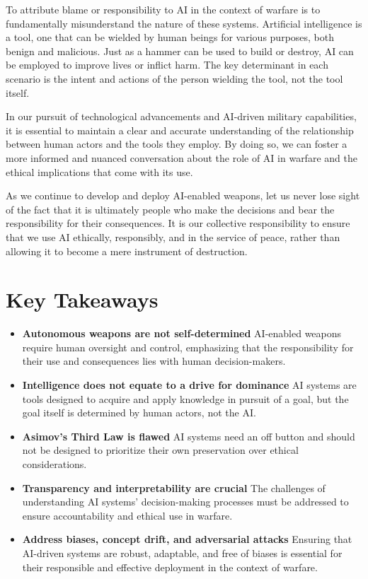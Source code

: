 To attribute blame or responsibility to AI in the context of warfare is to fundamentally misunderstand the nature of these systems. Artificial intelligence is a tool, one that can be wielded by human beings for various purposes, both benign and malicious. Just as a hammer can be used to build or destroy, AI can be employed to improve lives or inflict harm. The key determinant in each scenario is the intent and actions of the person wielding the tool, not the tool itself.

In our pursuit of technological advancements and AI-driven military capabilities, it is essential to maintain a clear and accurate understanding of the relationship between human actors and the tools they employ. By doing so, we can foster a more informed and nuanced conversation about the role of AI in warfare and the ethical implications that come with its use.

As we continue to develop and deploy AI-enabled weapons, let us never lose sight of the fact that it is ultimately people who make the decisions and bear the responsibility for their consequences. It is our collective responsibility to ensure that we use AI ethically, responsibly, and in the service of peace, rather than allowing it to become a mere instrument of destruction.

\section{Key Takeaways}

\begin{itemize}
\item \textbf{Autonomous weapons are not self-determined} AI-enabled weapons require human oversight and control, emphasizing that the responsibility for their use and consequences lies with human decision-makers.
\item \textbf{Intelligence does not equate to a drive for dominance} AI systems are tools designed to acquire and apply knowledge in pursuit of a goal, but the goal itself is determined by human actors, not the AI.
\item \textbf{Asimov's Third Law is flawed} AI systems need an off button and should not be designed to prioritize their own preservation over ethical considerations.
\item \textbf{Transparency and interpretability are crucial} The challenges of understanding AI systems' decision-making processes must be addressed to ensure accountability and ethical use in warfare.
\item \textbf{Address biases, concept drift, and adversarial attacks} Ensuring that AI-driven systems are robust, adaptable, and free of biases is essential for their responsible and effective deployment in the context of warfare.
\end{itemize}
